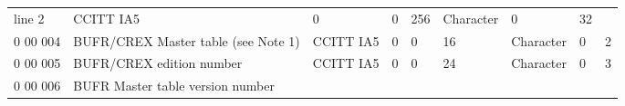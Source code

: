 \begin{longtable}[]{@{}lllllllll@{}}
\begin{minipage}[t]{0.08\columnwidth}
line 2\strut
\end{minipage} & \begin{minipage}[t]{0.08\columnwidth}\raggedright
CCITT IA5\strut
\end{minipage} & \begin{minipage}[t]{0.08\columnwidth}\raggedright
0\strut
\end{minipage} & \begin{minipage}[t]{0.08\columnwidth}\raggedright
0\strut
\end{minipage} & \begin{minipage}[t]{0.08\columnwidth}\raggedright
256\strut
\end{minipage} & \begin{minipage}[t]{0.08\columnwidth}\raggedright
Character\strut
\end{minipage} & \begin{minipage}[t]{0.08\columnwidth}\raggedright
0\strut
\end{minipage} & \begin{minipage}[t]{0.08\columnwidth}\raggedright
32\strut
\end{minipage}\tabularnewline
0 00 004 & BUFR/CREX Master table (see Note 1) & CCITT IA5 & 0 & 0 & 16 & Character & 0 & 2\tabularnewline
0 00 005 & BUFR/CREX edition number & CCITT IA5 & 0 & 0 & 24 & Character & 0 & 3\tabularnewline
\begin{minipage}[t]{0.08\columnwidth}\raggedright
0 00 006\strut
\end{minipage} & \begin{minipage}[t]{0.08\columnwidth}\raggedright
BUFR Master table version number


\end{minipage}
\end{longtable}

